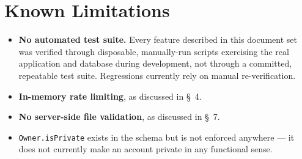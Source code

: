 \documentclass[11pt,a4paper]{article}
\begin{document}
\section{Known Limitations}
\begin{itemize}[leftmargin=*]
  \item \textbf{No automated test suite.} Every feature described in this document set
        was verified through disposable, manually-run scripts exercising the real
        application and database during development, not through a committed,
        repeatable test suite. Regressions currently rely on manual re-verification.
  \item \textbf{In-memory rate limiting}, as discussed in \S~4.
  \item \textbf{No server-side file validation}, as discussed in \S~7.
  \item \texttt{Owner.isPrivate} exists in the schema but is not enforced anywhere ---
        it does not currently make an account private in any functional sense.
\end{itemize}
\end{document}
